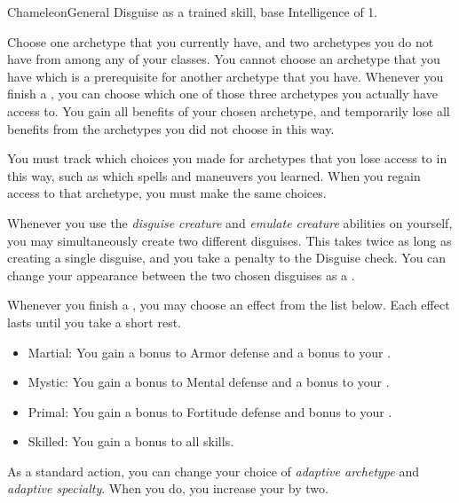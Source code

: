     \begin{feat}{Chameleon}{General}
        \featpre Disguise as a trained skill, base Intelligence of 1.

         Choose one archetype that you currently have, and two archetypes you do not have from among any of your classes.
        You cannot choose an archetype that you have which is a prerequisite for another archetype that you have.
        Whenever you finish a , you can choose which one of those three archetypes you actually have access to.
        You gain all benefits of your chosen archetype, and temporarily lose all benefits from the archetypes you did not choose in this way.

        You must track which choices you made for archetypes that you lose access to in this way, such as which spells and maneuvers you learned.
        When you regain access to that archetype, you must make the same choices.

         Whenever you use the \textit{disguise creature} and \textit{emulate creature} abilities on yourself, you may simultaneously create two different disguises.
        This takes twice as long as creating a single disguise, and you take a  penalty to the Disguise check.
        You can change your appearance between the two chosen disguises as a .

         Whenever you finish a , you may choose an effect from the list below.
        Each effect lasts until you take a short rest.
        \begin{itemize}
            \item Martial: You gain a  bonus to Armor defense and a  bonus to your  .
            \item Mystic: You gain a  bonus to Mental defense and a  bonus to your  .
            \item Primal: You gain a  bonus to Fortitude defense and  bonus to your .
            \item Skilled: You gain a  bonus to all skills.
        \end{itemize}

         As a standard action, you can change your choice of \textit{adaptive archetype} and \textit{adaptive specialty}.
        When you do, you increase your  by two.


\end{feat}
